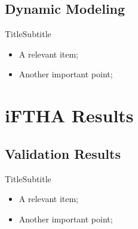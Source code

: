 \subsection{Dynamic Modeling}

    \begin{frame}{Title}{Subtitle}\vspace*{-2em}
        \begin{itemize}
            \item<2->  A \alert{relevant} item;
            \item<3->  Another \alert{important} point;
        \end{itemize}
    \end{frame}

\section{iFTHA Results}

\subsection{Validation Results}

    \begin{frame}{Title}{Subtitle}\vspace*{-2em}
        \begin{itemize}
            \item<2->  A \alert{relevant} item;
            \item<3->  Another \alert{important} point;
        \end{itemize}
    \end{frame}

